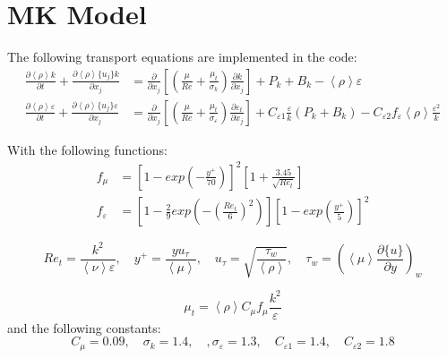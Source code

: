 \documentclass[paper=a4, fontsize=12pt]{scrartcl} %
\newcommand{\rave}[1]{\left<{#1}\right>}
\newcommand{\fave}[1]{\{{#1}\}}
\newcommand{\pd}{\partial }
\newcommand{\fpd}[2]{\frac{\partial #1}{\partial {#2}}}
\begin{document}
\section{MK Model}
The following transport equations are implemented in the code:
\begin{equation} \label{eq:ktDeng}
\begin{split}
\fpd{\rave{\rho} k}{ t} + \fpd{\rave{\rho} \fave{u_j} k}{x_j} &= \frac{\pd}{\pd x_j}\left[\left(\frac{\mu}{Re} + \frac{\mu_t}{\sigma_k}\right)\fpd {k}{x_j}\right] + P_{k} + B_k- \rave{\rho}\varepsilon \\
\fpd{ \rave{\rho} \varepsilon}{t} + \fpd{ \rave{\rho} \fave{u_j} \varepsilon}{ x_j} &= \frac{\pd}{\pd x_j}\left[ \left(\frac{\mu}{Re} + \frac{\mu_t}{\sigma_{\varepsilon}}\right)\fpd{ \varepsilon_t}{x_j}\right] + C_{\varepsilon1}\frac{\varepsilon}{k}\left(P_k+B_k\right)  -C_{\varepsilon2} f_{\varepsilon}\rave{\rho}\frac{\varepsilon^2}{k}   
\end{split}
\end{equation}

With the following functions:
\begin{equation}
\begin{split}
    f_\mu &= \left[1-exp\left(-\frac{y^+}{70}\right)\right]^2\left[1+\frac{3.45}{\sqrt{Re_t}}\right] \\
    f_\varepsilon  &=\left[1-\frac{2}{9}exp\left(-\left(\frac{Re_t}{6}\right)^2\right)\right] \left[1-exp\left(\frac{y^+}{5}\right)\right]^2 
\end{split}
\end{equation}

\begin{equation}
Re_t = \frac{k^2}{\rave{\nu} \varepsilon}, \quad y^+ =  \frac{y u_\tau}{\rave{\mu}}, \quad u_\tau = \sqrt{\frac{\tau_w}{\rave{\rho}}}, \quad \tau_w = \left(\rave{\mu}\fpd{ \fave{u}} {y}\right)_w
\end{equation}

\begin{equation}
\mu_t = \rave{\rho} C_\mu f_\mu \frac{k^2}{\varepsilon}
\end{equation}
and the following constants:
\begin{equation}
C_\mu = 0.09, \quad \sigma_k = 1.4, \quad, \sigma_\varepsilon = 1.3, \quad C_{\varepsilon1} = 1.4, \quad C_{\varepsilon2}=1.8
\end{equation}
\end{document}
